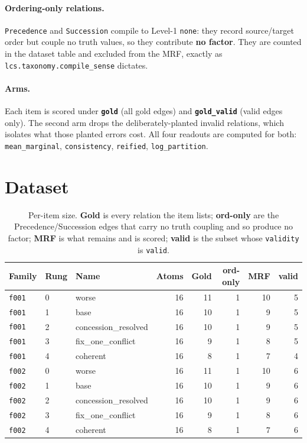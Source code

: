 \documentclass[11pt]{article}
\begin{document}
\paragraph{Ordering-only relations.} \texttt{Precedence} and \texttt{Succession} compile to Level-1 \texttt{none}: they record source/target order but couple no truth values, so they contribute \textbf{no factor}. They are counted in the dataset table and excluded from the MRF, exactly as \texttt{lcs.taxonomy.compile\_sense} dictates.

\paragraph{Arms.} Each item is scored under \textbf{\texttt{gold}} (all gold edges) and \textbf{\texttt{gold\_valid}} (valid edges only). The second arm drops the deliberately-planted invalid relations, which isolates what those planted errors cost. All four readouts are computed for both: \texttt{mean\_marginal}, \texttt{consistency}, \texttt{reified}, \texttt{log\_partition}.

\section{Dataset}

\begin{table}[htbp]
\centering
\small
\caption{Per-item size. \textbf{Gold} is every relation the item lists; \textbf{ord-only} are the Precedence/Succession edges that carry no truth coupling and so produce no factor; \textbf{MRF} is what remains and is scored; \textbf{valid} is the subset whose \texttt{validity} is \texttt{valid}.}
\label{tab:dataset}
\begin{tabular}{lllrrrrr}
\toprule
Family & Rung & Name & Atoms & Gold & ord-only & MRF & valid \\
\midrule
\texttt{f001} & 0 & worse & 16 & 11 & 1 & 10 & 5 \\
\texttt{f001} & 1 & base & 16 & 10 & 1 & 9 & 5 \\
\texttt{f001} & 2 & concession\_resolved & 16 & 10 & 1 & 9 & 5 \\
\texttt{f001} & 3 & fix\_one\_conflict & 16 & 9 & 1 & 8 & 5 \\
\texttt{f001} & 4 & coherent & 16 & 8 & 1 & 7 & 4 \\
\texttt{f002} & 0 & worse & 16 & 11 & 1 & 10 & 6 \\
\texttt{f002} & 1 & base & 16 & 10 & 1 & 9 & 6 \\
\texttt{f002} & 2 & concession\_resolved & 16 & 10 & 1 & 9 & 6 \\
\texttt{f002} & 3 & fix\_one\_conflict & 16 & 9 & 1 & 8 & 6 \\
\texttt{f002} & 4 & coherent & 16 & 8 & 1 & 7 & 6 \\
\bottomrule
\end{tabular}
\end{table}
\end{document}
